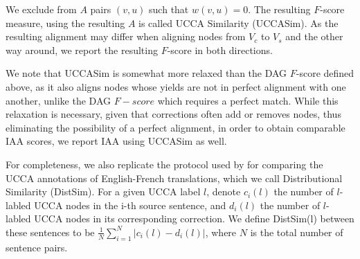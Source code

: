 \documentclass[letter,11pt]{article}
\newcommand{\oa}[1]{\footnote{\color{red}OA: #1}}
\begin{document}
We exclude from $A$ pairs $(v,u)$ such that $w(v,u)=0$.
The resulting $F$-score measure, using the resulting $A$ is called UCCA Similarity ({\sc UCCASim}).
As the resulting alignment may differ when aligning nodes from $V_c$ to $V_s$
and the other way around, we report the resulting $F$-score in both directions.

We note that {\sc UCCASim} is somewhat more relaxed than the DAG $F$-score defined above,
as it also aligns nodes whose yields are not in perfect alignment with one another,
unlike the DAG $F-score$ which requires a perfect match.
While this relaxation is necessary, given that corrections often add
or removes nodes, thus eliminating the possibility of a perfect alignment,
in order to obtain comparable IAA scores, we report IAA using {\sc UCCASim} as well.


For completeness, we also replicate the protocol used by 
for comparing the UCCA annotations of English-French translations, which we call
Distributional Similarity ({\sc DistSim}).
For a given UCCA label $l$, denote $c_i(l)$ the number of $l$-labled UCCA nodes
in the i-th source sentence, and $d_i(l)$ the number of $l$-labled UCCA nodes
in its corresponding correction. We define {\sc DistSim}(l) between these
sentences to be $\frac{1}{N}\sum_{i=1}^N \vert c_i(l) - d_i(l) \vert$, where
$N$ is the total number of sentence pairs.

\end{document}

